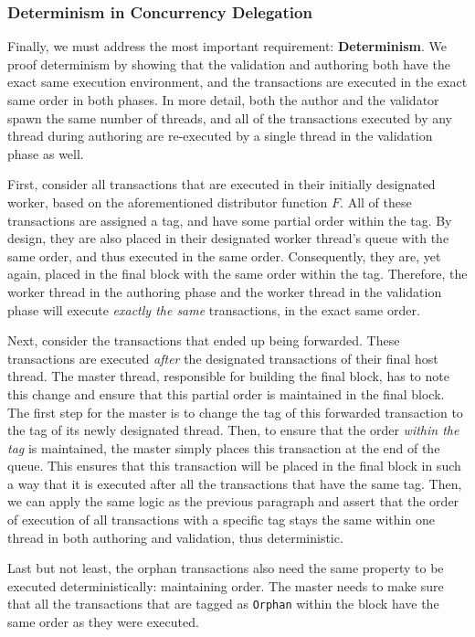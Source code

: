 \subsubsection{Determinism in Concurrency Delegation}

Finally, we must address the most important requirement: \textbf{Determinism}. We proof determinism by
showing that the validation and authoring both have the exact same execution environment, and the
transactions are executed in the exact same order in both phases. In more detail, both the author and the
validator spawn the same number of threads, and all of the transactions executed by any
thread during authoring are re-executed by a single thread in the validation phase as well.

First, consider all transactions that are executed in their initially designated worker, based on
the aforementioned distributor function $F$. All of these transactions are assigned a tag, and have
some partial order within the tag. By design, they are also placed in their
designated worker thread's queue with the same order, and thus executed in the same order.
Consequently, they are, yet again, placed in the final block with the same order within the tag.
Therefore, the worker thread in the authoring phase and the worker thread
in the validation phase will execute \textit{exactly the same} transactions, in the exact same
order.

Next, consider the transactions that ended up being forwarded. These transactions are
executed \textit{after} the designated transactions of their final host thread. The master thread,
responsible for building the final block, has to note this change and ensure that this partial
order is maintained in the final block. The first step for the master is to change the tag of this
forwarded transaction to the tag of its newly designated thread. Then, to ensure that the order
\textit{within the tag} is maintained, the master simply places this transaction at the end
of the queue. This ensures that this transaction will be placed in the final block in such a way
that it is executed after all the transactions that have the same tag. Then, we can apply the same
logic as the previous paragraph and assert that the order of execution of all transactions with a
specific tag stays the same within one thread in both authoring and validation, thus deterministic.

Last but not least, the orphan transactions also need the same property to be executed deterministically:
maintaining order. The master needs to make sure that all the transactions that are tagged as
\texttt{Orphan} within the block have the same order as they were executed.

